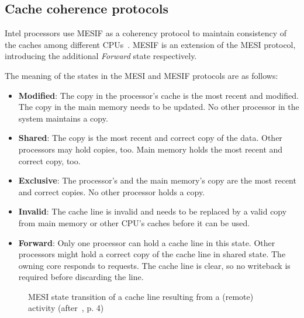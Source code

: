 \subsection{Cache coherence protocols}
\label{sec:state:technical:caches_protocol}
Intel processors
use MESIF as a coherency protocol to maintain consistency of the caches among
different CPUs~\cite{thomadakis2011architecture}.
MESIF is an extension of the MESI protocol, introducing the additional
\textit{Forward} state respectively.

The meaning of the states in the MESI and MESIF protocols are as follows:
\begin{itemize}
  \item \textbf{Modified}: The copy in the processor's cache is the most
    recent and modified. The copy in the main memory needs to be updated.
    No other processor in the system maintains a copy.
  \item \textbf{Shared}:  The copy is the most recent and correct copy of the
    data. Other processors may hold copies, too. Main memory holds the
    most recent and correct copy, too.
  \item \textbf{Exclusive}: The processor's and the main memory's copy are the
    most recent and correct copies. No other processor holds a copy.
  \item \textbf{Invalid}: The cache line is invalid and needs to be replaced by
    a valid copy from main memory or other CPU's caches before it can be used.
  \item \textbf{Forward}: Only one processor can hold a cache line in this
    state. Other processors might hold a correct copy of the cache line in
    shared state. The owning core responds to requests. The cache line is clear,
    so no writeback is required before discarding the line.
\end{itemize}

\begin{figure}
  \begin{center}
    
    \caption{MESI state transition of a cache line resulting from a (remote) activity (after~\cite{mckenney2010memory}, p. 4)}
    \label{fig:state:technical:mesi}
  \end{center}
\end{figure}

